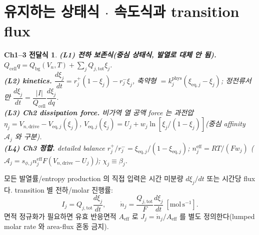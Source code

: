\documentclass[11pt,a4paper]{article}
\newtheorem*{linkbox}{Ch1--3 전달식}
\newcommand{\eff}{\mathrm{eff}}
\newcommand{\eq}{\mathrm{eq}}
\newcommand{\drive}{\mathrm{drive}}
\newcommand{\tot}{\mathrm{tot}}
\newcommand{\bg}{\mathrm{bg}}
\newcommand{\cell}{\mathrm{cell}}
\begin{document}
\section{유지하는 상태식 $\cdot$ 속도식과 transition flux}\label{sec:ch4_inherit}
\begin{linkbox}
\textbf{(L1) 전하 보존식(중심 상태식, 발열로 대체 안 됨).} $Q_\cell q=Q_\bg(V_n,T)+\sum_j Q_{j,\tot}\xi_j$.\\
\textbf{(L2) kinetics.} $\dfrac{d\xi_j}{dt}=r_j^+(1-\xi_j)-r_j^-\xi_j$, 축약형 $=k_j^{\mathrm{phys}}(\xi_{\eq,j}-\xi_j)$;
정전류서만 $\dfrac{d\xi_j}{dt}=\dfrac{|I|}{Q_\cell}\dfrac{d\xi_j}{dq}$.\\
\textbf{(L3) Ch2 dissipation force.} 비가역 열 공액 force 는 과전압 $\eta_j=V_{n,\drive}-V_{\eq,j}(\xi_j)$,
$V_{\eq,j}(\xi_j)=U_j+w_j\ln[\xi_j/(1-\xi_j)]$(중심 affinity $\mathcal A_j$ 와 구분).\\
\textbf{(L4) Ch3 정합.} detailed balance $r_j^+/r_j^-=\xi_{\eq,j}/(1-\xi_{\eq,j})$; $n_j^{\eff}=RT/(Fw_j)$
($\mathcal A_j=s_{\phi,j}n_j^{\eff}F(V_{n,\drive}-U_j)$); $\chi_j\equiv\beta_j$.
\end{linkbox}
모든 발열률/entropy production 의 직접 입력은 시간 미분량 $d\xi_j/dt$ 또는 시간당 flux 다. transition 별
전하/molar 진행률:
\begin{equation}
I_j=Q_{j,\tot}\frac{d\xi_j}{dt},\qquad \dot n_j=\frac{Q_{j,\tot}}{F}\frac{d\xi_j}{dt}\ [\mathrm{mol\,s^{-1}}].
\label{eq:ch4_Ij}
\end{equation}
면적 정규화가 필요하면 유효 반응면적 $A_{\eff}$ 로 $J_j=\dot n_j/A_{\eff}$ 를 별도 정의한다(lumped molar
rate 와 area-flux 혼동 금지).

\end{document}
